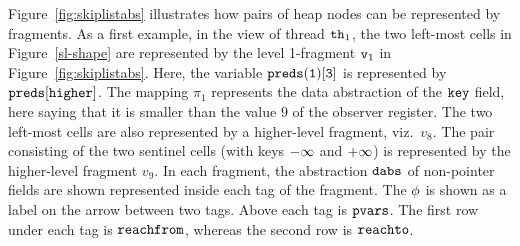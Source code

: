 Figure~\ref{fig:skiplistabs} illustrates how pairs of heap nodes can be represented by fragments.
As a first example, in the view of thread ${\tt th}_1$, the two left-most cells
in Figure~\ref{sl-shape} are represented by the level 1-fragment $\mathtt{v}_1$ in Figure~\ref{fig:skiplistabs}.
Here, the variable $\tt preds(1)[3]$ is represented by $\tt preds[higher]$. The mapping $\pi_1$ represents the data abstraction of
the $\tt key$ field, here saying that it is smaller than the value $9$ of the
observer register.
The two left-most cells are also represented by
a higher-level fragment, viz.\ $v_8$.
The pair consisting of the two sentinel cells (with keys $\tt -\infty$ and $\tt +\infty$) is represented by the higher-level fragment $v_9$. In each fragment, the abstraction $\mathtt{dabs}$ of non-pointer fields are shown represented inside each tag of the fragment. The $\phi$ is shown as a label on the  arrow between two tags. Above each tag is $\mathtt{pvars}$. The first row under each tag is $\mathtt{reachfrom}$, whereas the second row is $\mathtt{reachto}$.
 

